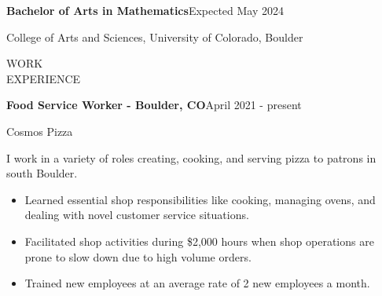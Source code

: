 \documentclass{article}
\newcommand{\itemSectionSpace}{\vspace{0.2in}}
\newcommand{\sectionSpace}{\vspace{0.3in}}
\begin{document}
\begin{minipage}[t]{0.85\linewidth}
\textbf{Bachelor of Arts in Mathematics}\hfill Expected May 2024

College of Arts and Sciences, University of Colorado, Boulder

\end{minipage}

\sectionSpace



\begin{minipage}[t]{0.125\linewidth}
\uppercase{Work\\Experience}
\end{minipage}%
\hfill
\begin{minipage}[t]{0.85\linewidth}
\textbf{Food Service Worker - Boulder, CO}\hfill April 2021 - present

Cosmos Pizza

I work in a variety of roles creating, cooking, and serving pizza to patrons in south Boulder.
\begin{itemize}[noitemsep,topsep=0pt]
   \item Learned essential shop responsibilities like cooking, managing ovens, and dealing with novel customer service situations.
   \item Facilitated shop activities during \$2,000 hours when shop operations are prone to slow down due to high volume orders.
   \item Trained new employees at an average rate of 2 new employees a month.
 \end{itemize}
\end{minipage}

\itemSectionSpace
\end{document}
